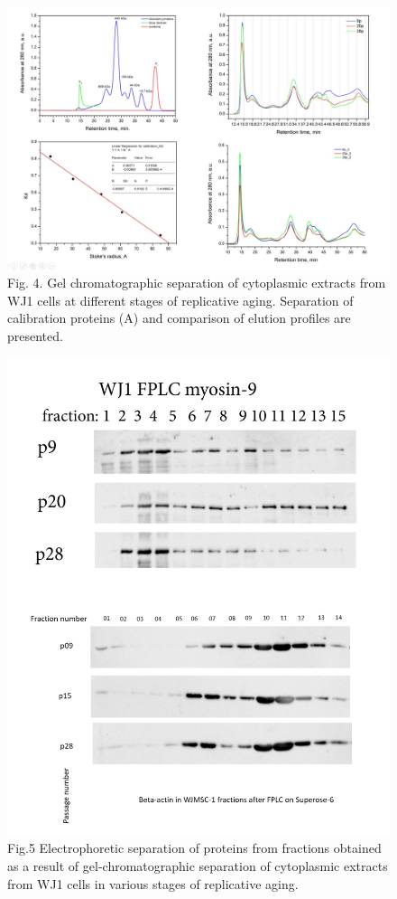 \documentclass[a4paper,12pt]{article}
\begin{document}
\begin{figure}[hbt!]
\centering
\includegraphics[width=0.8\linewidth]{fig4.jpg}
\caption{Fig. 4. Gel chromatographic separation of cytoplasmic extracts from WJ1 cells at different stages of replicative aging. Separation of calibration proteins (A) and comparison of elution profiles are presented.}
\label{fig:fig4}
\end{figure}

\begin{figure}[hbt!]
\centering
\includegraphics[width=0.8\linewidth]{fig5.png}
\caption{Fig.5 Electrophoretic separation of proteins from fractions obtained as a result of gel-chromatographic separation of cytoplasmic extracts from WJ1 cells in various stages of replicative aging.}
\label{fig:fig5}
\end{figure}
\end{document}
